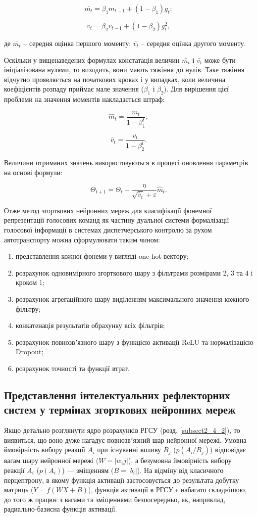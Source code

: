 \[
\bar{m_t}=\beta_1m_{t-1}+(1-\beta_1)g_t;
\]

\[
\bar{v_t}=\beta_2v_{t-1}+(1-\beta_2)g^2_t,
\]

\noindent
де $\bar{m_t}$ – середня оцінка першого моменту; $\bar{v_t}$ – середня оцінка другого моменту.

Оскільки у вищенаведених формулах констатація величин $\bar{m_t}$ і $\bar{v_t}$ може бути ініціалізована нулями, то виходить, вони мають тяжіння до нулів. Таке тяжіння відчутно проявляється на початкових кроках і у випадках, коли величина коефіцієнтів розпаду приймає мале значення ($\beta_1$ і $\beta_2$). Для вирішення цієї проблеми на значення моментів накладається штраф:

\[
\hat{m}_t=\frac{m_t}{1-\beta_1^t};
\]

\[
\hat{v}_t=\frac{v_t}{1-\beta_2^t}.
\]

Величини отриманих значень використовуються в процесі оновлення параметрів на основі формули:

\[
\Theta_{t+1}=\Theta_t-\frac{\eta}{\sqrt{\hat{v}_t}+\varepsilon}\hat{m}_t.
\]

Отже метод згорткових нейронних мереж для класифікації фонемної репрезентації голосових команд як частину дуальної системи формалізації голосової інформації в системах диспетчерського контролю за рухом автотранспорту можна сформулювати таким чином:

\begin{enumerate}
	\item представлення кожної фонеми у вигляді one-hot вектору;
	\item розрахунок одновимірного згорткового шару з фільтрами розмірами 2, 3 та 4 і кроком 1;
	\item розрахунок агрегаційного шару виділенням максимального значення кожного фільтру;
	\item конкатенація результатів обрахунку всіх фільтрів;
	\item розрахунок повнозвʼязного шару з функцією активації ReLU та нормалізацією Dropout;
	\item розрахунок точності та функції втрат.
\end{enumerate}

\subsection{Представлення інтелектуальних рефлекторних систем у термінах згорткових нейронних мереж}

Якщо детально розглянути ядро розрахунків РГСУ (розд. \ref{subsect2_4_2}), то виявиться, що воно дуже нагадує повнозвʼязний шар нейронної мережі. Умовна ймовірність вибору реакції $A_i$ при існуванні впливу $B_j$ ($p(A_i/B_j)$) відповідає вагам шару нейронної мережі ($W = |w_ij|$), а безумовна ймовірність вибору реакції $A_i$ ($p(A_i)$) ---  зміщенням ($B = |b_i|$). На відміну від класичного перцептрону, в якому функція активації застосовується до результата добутку матриць ($Y=f(WX + B)$), функція активації в РГСУ є набагато складнішою, до того ж працює з вагами та зміщеннями безпосередньо, як, наприклад, радиально-базисна функція активації.

